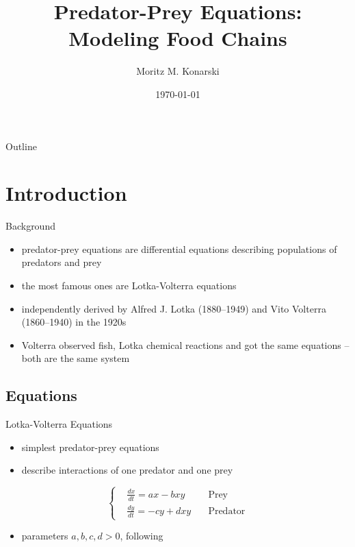\documentclass[hyperref={colorlinks,allcolors=black}]{beamer}
\title[Predator-Prey Equations]{Predator-Prey Equations:\\Modeling Food Chains}
\author[M. Konarski]{Moritz M. Konarski}
\institute[AUCA]{Applied Mathematics Department \\ 
    American University of Central Asia}
\date{\today}
\begin{document}
\begin{frame}
  \titlepage
\end{frame}

\begin{frame}{Outline}
  \tableofcontents
\end{frame}


\section{Introduction}

\begin{frame}{Background}
    \begin{itemize}\setlength\itemsep{1em}
        \item predator-prey equations are differential equations describing 
            populations of predators and prey
        \item the most famous ones are Lotka-Volterra equations
        \item independently derived by Alfred J. Lotka (1880--1949) and Vito 
            Volterra (1860--1940) in the 1920s
        \item Volterra observed fish, Lotka chemical reactions and got the same
            equations -- both are the same system \cite{hoppensteadt}
    \end{itemize}
\end{frame}

\subsection{Equations}

\begin{frame}{Lotka-Volterra Equations}
    \begin{itemize}\setlength\itemsep{1em}
        \item simplest predator-prey equations
        \item describe interactions of one predator and one prey
    \end{itemize}
%
    \begin{equation}    
        \left\{\begin{aligned}
            &\frac{dx}{dt} = ax - bxy \quad &\text{Prey}\\
            &\frac{dy}{dt} = -cy +dxy \quad &\text{Predator}
        \end{aligned}\right.
        \label{eq:2s_system}
    \end{equation}
%
    \begin{itemize}\setlength\itemsep{1em}
        \item parameters $a,b,c,d>0$, following \cite{chauvet}
    \end{itemize}
\end{frame}
\end{document}

